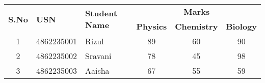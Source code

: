 \documentclass{article}
\begin{document}
\begin{table}[ht]
\centering
\begin{tabular}{|c|p{3cm}|p{3.5cm}|c|c|c|}
\hline
\multirow{2}{*}{\textbf{S.No}} & \multirow{2}{*}{\textbf{USN}} & \multirow{2}{*}{\textbf{Student Name}} & \multicolumn{3}{c|}{\textbf{Marks}} \\
\cline{4-6}
 &  &  & \textbf{Physics} & \textbf{Chemistry} & \textbf{Biology} \\
\hline
1 & 4862235001 & Rizul & 89 & 60 & 90 \\
2 & 4862235002 & Sravani & 78 & 45 & 98 \\
3 & 4862235003 & Aaisha & 67 & 55 & 59 \\
\hline
\end{tabular}
\end{table}
\end{document}
